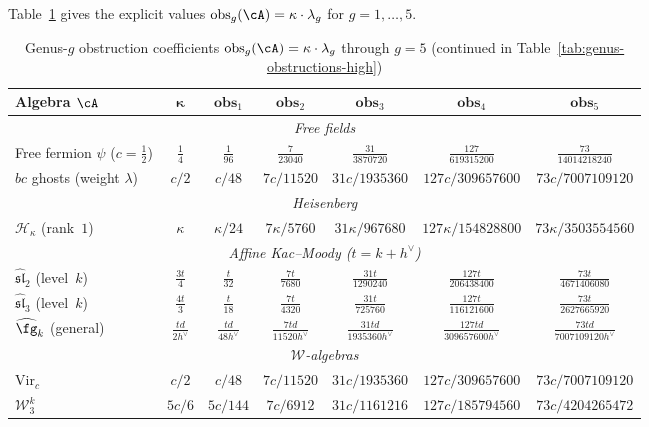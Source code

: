 Table~\ref{tab:genus-obstructions} gives the explicit values
$\operatorname{obs}_g(\cA) = \kappa \cdot \lambda_g$ for
$g = 1, \ldots, 5$.

\begin{table}[ht]
\centering
\caption{Genus-$g$ obstruction coefficients $\operatorname{obs}_g(\cA) = \kappa \cdot \lambda_g$ through $g = 5$
(continued in Table~\ref{tab:genus-obstructions-high})}
\label{tab:genus-obstructions}
\renewcommand{\arraystretch}{1.5}
{\footnotesize
\begin{tabular}{|l|c|c|c|c|c|c|}
\hline
\textbf{Algebra $\cA$}
  & $\boldsymbol{\kappa}$
  & $\mathbf{obs}_{1}$
  & $\mathbf{obs}_{2}$
  & $\mathbf{obs}_{3}$
  & $\mathbf{obs}_{4}$
  & $\mathbf{obs}_{5}$ \\
\hline
\multicolumn{7}{|c|}{\textit{Free fields}} \\
\hline
Free fermion $\psi$ ($c = \tfrac{1}{2}$)
  & $\tfrac{1}{4}$
  & $\tfrac{1}{96}$
  & $\tfrac{7}{23040}$
  & $\tfrac{31}{3870720}$
  & $\tfrac{127}{619315200}$
  & $\tfrac{73}{14014218240}$ \\
\hline
$bc$ ghosts (weight $\lambda$)
  & $c/2$
  & $c/48$
  & $7c/11520$
  & $31c/1935360$
  & $127c/309657600$
  & $73c/7007109120$ \\
\hline
\multicolumn{7}{|c|}{\textit{Heisenberg}} \\
\hline
$\mathcal{H}_\kappa$ (rank~$1$)
  & $\kappa$
  & $\kappa/24$
  & $7\kappa/5760$
  & $31\kappa/967680$
  & $127\kappa/154828800$
  & $73\kappa/3503554560$ \\
\hline
\multicolumn{7}{|c|}{\textit{Affine Kac--Moody ($t = k + h^\vee$)}} \\
\hline
$\widehat{\mathfrak{sl}}_2$ (level~$k$)
  & $\frac{3t}{4}$
  & $\frac{t}{32}$
  & $\frac{7t}{7680}$
  & $\frac{31t}{1290240}$
  & $\frac{127t}{206438400}$
  & $\frac{73t}{4671406080}$ \\[4pt]
\hline
$\widehat{\mathfrak{sl}}_3$ (level~$k$)
  & $\frac{4t}{3}$
  & $\frac{t}{18}$
  & $\frac{7t}{4320}$
  & $\frac{31t}{725760}$
  & $\frac{127t}{116121600}$
  & $\frac{73t}{2627665920}$ \\[4pt]
\hline
$\widehat{\fg}_k$ (general)
  & $\frac{td}{2h^\vee}$
  & $\frac{td}{48 h^\vee}$
  & $\frac{7td}{11520 h^\vee}$
  & $\frac{31td}{1935360 h^\vee}$
  & $\frac{127td}{309657600 h^\vee}$
  & $\frac{73td}{7007109120 h^\vee}$ \\[4pt]
\hline
\multicolumn{7}{|c|}{\textit{$\mathcal{W}$-algebras}} \\
\hline
$\mathrm{Vir}_c$
  & $c/2$
  & $c/48$
  & $7c/11520$
  & $31c/1935360$
  & $127c/309657600$
  & $73c/7007109120$ \\[4pt]
\hline
$\mathcal{W}_3^k$
  & $5c/6$
  & $5c/144$
  & $7c/6912$
  & $31c/1161216$
  & $127c/185794560$
  & $73c/4204265472$ \\[4pt]
\hline
\end{tabular}
}
\end{table}

